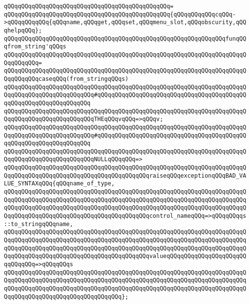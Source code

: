 \verb|qQQqqQQqqQQqqQQqqQQqqQQqqQQqqQQqqQQqqQQqqQQqqQQq=|\newline
\verb|qQQqqQQqqQQqqQQqqQQqqQQqqQQqqQQqqQQqqQQqqQQqqQQq{qQQqqQQqqQQqcqQQq->qQQqqQQqqQQq{qQQqname,qQQqget,qQQqset,qQQqmenu_slot,qQQqobscurity,qQQqhelpqQQq};|\newline
\newline
\verb|qQQqqQQqqQQqqQQqqQQqqQQqqQQqqQQqqQQqqQQqqQQqqQQqqQQqqQQqqQQqqQQqfunqQQqfrom_string'qQQqs|\newline
\verb|qQQqqQQqqQQqqQQqqQQqqQQqqQQqqQQqqQQqqQQqqQQqqQQqqQQqqQQqqQQqqQQqqQQqqQQqqQQqqQQq=|\newline
\verb|qQQqqQQqqQQqqQQqqQQqqQQqqQQqqQQqqQQqqQQqqQQqqQQqqQQqqQQqqQQqqQQqqQQqqQQqqQQqqQQqcaseqQQq(from_stringqQQqs)|\newline
\verb|qQQqqQQqqQQqqQQqqQQqqQQqqQQqqQQqqQQqqQQqqQQqqQQqqQQqqQQqqQQqqQQqqQQqqQQqqQQqqQQqqQQqqQQqqQQqqQQq#qQQqqQQqqQQqqQQqqQQqqQQqqQQqqQQqqQQqqQQqqQQqqQQqqQQqqQQqqQQqqQQqqQQq|\newline
\verb|qQQqqQQqqQQqqQQqqQQqqQQqqQQqqQQqqQQqqQQqqQQqqQQqqQQqqQQqqQQqqQQqqQQqqQQqqQQqqQQqqQQqqQQqqQQqqQQqTHEqQQqvqQQq=>qQQqv;|\newline
\verb|qQQqqQQqqQQqqQQqqQQqqQQqqQQqqQQqqQQqqQQqqQQqqQQqqQQqqQQqqQQqqQQqqQQqqQQqqQQqqQQqqQQqqQQqqQQqqQQq#qQQqqQQqqQQqqQQqqQQqqQQqqQQqqQQqqQQqqQQqqQQqqQQqqQQqqQQqqQQqqQQqqQQq|\newline
\verb|qQQqqQQqqQQqqQQqqQQqqQQqqQQqqQQqqQQqqQQqqQQqqQQqqQQqqQQqqQQqqQQqqQQqqQQqqQQqqQQqqQQqqQQqqQQqqQQqNULLqQQqqQQq=>|\newline
\verb|qQQqqQQqqQQqqQQqqQQqqQQqqQQqqQQqqQQqqQQqqQQqqQQqqQQqqQQqqQQqqQQqqQQqqQQqqQQqqQQqqQQqqQQqqQQqqQQqqQQqqQQqqQQqqQQqraiseqQQqexceptionqQQqBAD_VALUE_SYNTAXqQQq{qQQqname_of_type,|\newline
\verb|qQQqqQQqqQQqqQQqqQQqqQQqqQQqqQQqqQQqqQQqqQQqqQQqqQQqqQQqqQQqqQQqqQQqqQQqqQQqqQQqqQQqqQQqqQQqqQQqqQQqqQQqqQQqqQQqqQQqqQQqqQQqqQQqqQQqqQQqqQQqqQQqqQQqqQQqqQQqqQQqqQQqqQQqqQQqqQQqqQQqqQQqqQQqqQQqqQQqqQQqqQQqqQQqqQQqqQQqqQQqqQQqqQQqqQQqqQQqqQQqqQQqqQQqqQQqcontrol_nameqQQq=>qQQqqQQqqs::to_stringqQQqname,|\newline
\verb|qQQqqQQqqQQqqQQqqQQqqQQqqQQqqQQqqQQqqQQqqQQqqQQqqQQqqQQqqQQqqQQqqQQqqQQqqQQqqQQqqQQqqQQqqQQqqQQqqQQqqQQqqQQqqQQqqQQqqQQqqQQqqQQqqQQqqQQqqQQqqQQqqQQqqQQqqQQqqQQqqQQqqQQqqQQqqQQqqQQqqQQqqQQqqQQqqQQqqQQqqQQqqQQqqQQqqQQqqQQqqQQqqQQqqQQqqQQqqQQqqQQqqQQqqQQqvalueqQQqqQQqqQQqqQQqqQQqqQQqqQQqqQQq=>qQQqqQQqs|\newline
\verb|qQQqqQQqqQQqqQQqqQQqqQQqqQQqqQQqqQQqqQQqqQQqqQQqqQQqqQQqqQQqqQQqqQQqqQQqqQQqqQQqqQQqqQQqqQQqqQQqqQQqqQQqqQQqqQQqqQQqqQQqqQQqqQQqqQQqqQQqqQQqqQQqqQQqqQQqqQQqqQQqqQQqqQQqqQQqqQQqqQQqqQQqqQQqqQQqqQQqqQQqqQQqqQQqqQQqqQQqqQQqqQQqqQQqqQQqqQQqqQQqqQQq};|\newline
